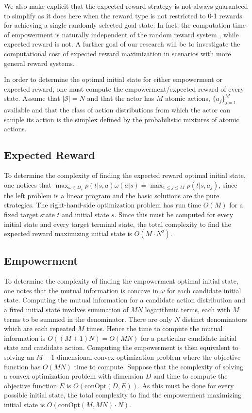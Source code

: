 \documentclass{article}
\newcommand{\Ss}{\mathcal{S}}
\begin{document}
We also make explicit that the expected reward strategy is not always guaranteed to simplify as it does here when the reward type is not restricted to 0-1 rewards for achieving a single randomly selected goal state. In fact, the computation time of empowerment is naturally independent of the random reward system%
, while expected reward is not.
A further goal of our research will be to investigate the computational cost of expected reward maximization in scenarios with more general reward systems.
 
In order to determine the optimal initial state for either empowerment or expected reward, one must compute the empowerment/expected reward of every state.
Assume that $|\Ss|=N$ and that the actor has $M$ atomic actions, $\{a_j\}_{j=1}^M$ available and that the class of action distributions from which the actor can sample its action is the simplex defined by the probabilistic mixtures of atomic actions. 

\subsection{Expected Reward}
To determine the complexity of finding the expected reward optimal initial state, one notices that $\max_{\omega\in\Omega_s} p(t|s,a)\omega(a|s) = \max_{1\leq j \leq M} p(t|s,a_j)$, since the left problem is a linear program and the basic solutions are the pure strategies.
The right-hand-side optimization problem has run time $O(M)$ for a fixed target state $t$ and initial state $s$. Since this must be computed for every initial state and every target terminal state, the total complexity to find the expected reward maximizing initial state is $O(M\cdot N^2)$. 

\subsection{Empowerment}
To determine the complexity of finding the empowerment optimal initial state, one notes that the mutual information is concave \cite{braverman2011information} in $\omega$ for each candidate initial state. Computing the mutual information for a candidate action distribution and a fixed initial state involves summation of $MN$ logarithmic terms, each with $M$ terms to be summed in the denominator. There are only $N$ distinct denominators which are each repeated $M$ times. Hence the time to compute the mutual information is $O((M+1)N)=O(MN)$ for a particular candidate initial state and candidate action. Computing the empowerment is then equivalent to solving an $M-1$ dimensional convex optimization problem where the objective function has $O(MN)$ time to compute.  Suppose that the complexity of solving a convex optimization problem with dimension $D$ and time to compute the objective function $E$ is $O(\text{conOpt}(D,E))$. As this must be done for every possible initial state, the total complexity to find the empowerment maximizing initial state is $O(\text{conOpt}(M,MN)\cdot N)$. 
\end{document}
